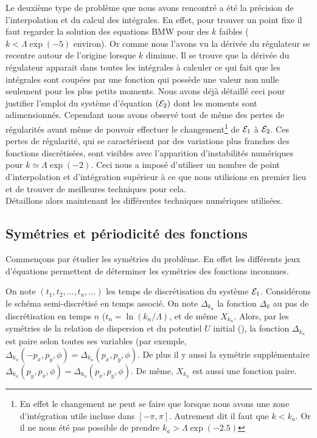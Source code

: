 \documentclass[10.5pt]{article}
\begin{document}
\begin{multicols}{2}
Le deuxième type de problème que nous avons rencontré a été la précision de l'interpolation et du calcul des intégrales. En effet, pour trouver un point fixe il faut regarder la solution des equations BMW pour des $k$ faibles ($k < \Lambda \exp(-5)$ environ). Or comme nous l'avons vu la dérivée du régulateur se recentre autour de l'origine lorsque $k$ diminue. Il se trouve que la dérivée du régulateur apparait dans toutes les intégrales à calculer ce qui fait que les intégrales sont coupées par une fonction qui possède une valeur non nulle seulement pour les plus petits moments. Nous avons déjà détaillé ceci pour justifier l'emploi du système d'équation $(\mathcal{E}_2)$ dont les moments sont adimensionnés. Cependant nous avons observé tout de même des pertes de régularités avant même de pouvoir effectuer le changement\footnote{En effet le changement ne peut se faire que lorsque nous avons une zone d'intégration utile incluse dans $[-\pi, \pi]$. Autrement dit il faut que $k<k_a$. Or il ne nous été pas possible de prendre $k_a > \Lambda \exp(-2.5)$} de $\mathcal{E}_1$ à $\mathcal{E}_2$. Ces pertes de régularité, qui se caractérisent par des variations plus franches des fonctions discrétisées, sont visibles avec l'apparition d'instabilités numériques pour $k \simeq \Lambda \exp(-2)$. Ceci nous a imposé d'utiliser un nombre de point d'interpolation et d'intégration supérieur à ce que nous utilisions en premier lieu et de trouver de meilleures techniques pour cela. \\

Détaillons alors maintenant les différentes techniques numériques utilisées.

\vspace*{11pt}



\subsection{Symétries et périodicité des fonctions}


Commençons par étudier les symétries du problème. En effet les différents jeux d'équations permettent de déterminer les symétries des fonctions inconnues.



On note $(t_1, t_2, ..., t_n, ...)$ les temps de discrétisation du système $\mathcal{E}_1$. Considérons le schéma semi-discrétisé en temps associé. On note $\Delta_{k_n}$ la fonction $\Delta_k$ au pas de discrétisation en temps $n$ ($t_n = \ln(k_n/\Lambda)$, et de même $X_{k_n}$. Alors, par les symétries de la relation de dispersion et du potentiel $U$ initial (), la fonction $\Delta_{k_n}$ est paire selon toutes ses variables (par exemple, $\Delta_{k_n}(-p_x, p_y, \phi) = \Delta_{k_n}(p_x, p_y, \phi)$. De plus il y aussi la symétrie supplémentaire $\Delta_{k_n}(p_y, p_x, \phi) = \Delta_{k_n} (p_x, p_y, \phi)$. De même, $X_{k_n}$ est aussi une fonction paire. 


\end{multicols}
\end{document}

